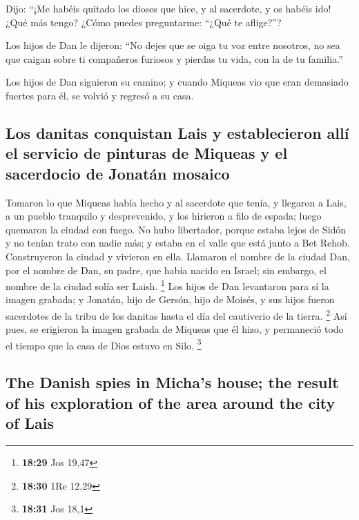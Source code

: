 \begin{paracol}{2}
 Dijo: ``¡Me habéis quitado los dioses que hice, y al
sacerdote, y os habéis ido! ¿Qué más tengo? ¿Cómo puedes preguntarme:
``¿Qué te aflige?''?

 Los hijos de Dan le dijeron: ``No dejes que se oiga tu
voz entre nosotros, no sea que caigan sobre ti compañeros furiosos y
pierdas tu vida, con la de tu familia.''

 Los hijos de Dan siguieron su camino; y cuando Miqueas
vio que eran demasiado fuertes para él, se volvió y regresó a su casa.

\hypertarget{los-danitas-conquistan-lais-y-establecieron-alluxed-el-servicio-de-pinturas-de-miqueas-y-el-sacerdocio-de-jonatuxe1n-mosaico}{%
\subsection{Los danitas conquistan Lais y establecieron allí el servicio
de pinturas de Miqueas y el sacerdocio de Jonatán
mosaico}\label{los-danitas-conquistan-lais-y-establecieron-alluxed-el-servicio-de-pinturas-de-miqueas-y-el-sacerdocio-de-jonatuxe1n-mosaico}}

 Tomaron lo que Miqueas había hecho y al sacerdote que
tenía, y llegaron a Lais, a un pueblo tranquilo y desprevenido, y los
hirieron a filo de espada; luego quemaron la ciudad con fuego.
 No hubo libertador, porque estaba lejos de Sidón y no
tenían trato con nadie más; y estaba en el valle que está junto a Bet
Rehob. Construyeron la ciudad y vivieron en ella. 
Llamaron el nombre de la ciudad Dan, por el nombre de Dan, su padre, que
había nacido en Israel; sin embargo, el nombre de la ciudad solía ser
Laish. \footnote{\textbf{18:29} Jos 19,47}  Los hijos de
Dan levantaron para sí la imagen grabada; y Jonatán, hijo de Gersón,
hijo de Moisés, y sus hijos fueron sacerdotes de la tribu de los danitas
hasta el día del cautiverio de la tierra. \footnote{\textbf{18:30} 1Re
  12,29}  Así pues, se erigieron la imagen grabada de
Miqueas que él hizo, y permaneció todo el tiempo que la casa de Dios
estuvo en Silo. \footnote{\textbf{18:31} Jos 18,1}

\switchcolumn
\begin{otherlanguage}{english}

\hypertarget{the-danish-spies-in-michas-house-the-result-of-his-exploration-of-the-area-around-the-city-of-lais}{%
\subsection{The Danish spies in Micha's house; the result of his
exploration of the area around the city of
Lais}\label{the-danish-spies-in-michas-house-the-result-of-his-exploration-of-the-area-around-the-city-of-lais}}


\end{otherlanguage}
\end{paracol}
